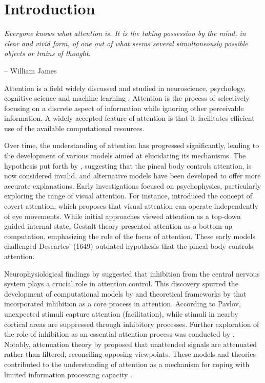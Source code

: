 \chapter{Introduction}

\startcontents[chapters]
\printmyminitoc 



\epigraph{\itshape  Everyone knows what attention is. It is the taking possession by the mind, in clear and vivid form, of one out of what seems several simultaneously possible objects or trains of thought.}{-- William James}

Attention is a field widely discussed and studied in neuroscience, psychology, cognitive science and machine learning \citep{chun2011taxonomy,cho2015describing}. Attention is the process of selectively focusing on a discrete aspect of information while ignoring other perceivable information. A widely accepted feature of attention is that it facilitates efficient use of the available computational resources.

Over time, the understanding of attention has progressed significantly, leading to the development of various models aimed at elucidating its mechanisms. The hypothesis put forth by \citet{descartes2010passions}, suggesting that the pineal body controls attention, is now considered invalid, and alternative models have been developed to offer more accurate explanations. Early investigations focused on psychophysics, particularly exploring the range of visual attention.  For instance, \citet{Helmholtz1989} introduced the concept of covert attention, which proposes that visual attention can operate independently of eye movements. While initial approaches viewed attention as a top-down guided internal state,  Gestalt theory \citep{kohler1947gestalt} presented attention as a bottom-up computation, emphasizing the role of the focus of attention. These early models challenged Descartes' (1649) outdated hypothesis that the pineal body controls attention.

Neurophysiological findings by \citet{Sechenov1863} suggested that inhibition from the central nervous system plays a crucial role in attention control. This discovery spurred the development of computational models by \citet{tsotsos1995modeling} and theoretical frameworks by \citet{Pavlov1927} that incorporated inhibition as a core process in attention. According to Pavlov, unexpected stimuli capture attention (facilitation), while stimuli in nearby cortical areas are suppressed through inhibitory processes. Further exploration of the role of inhibition as an essential attention process was conducted by \citet{itti2009bayesian}. Notably, attenuation theory by \citet{treisman1980feature} proposed that unattended signals are attenuated rather than filtered, reconciling opposing viewpoints. These models and theories contributed to the understanding of attention as a mechanism for coping with limited information processing capacity \citep{broadbent1958perception}.

